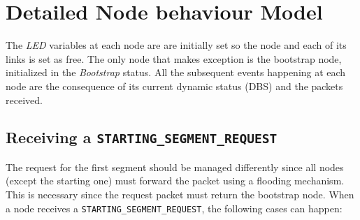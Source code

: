 \section{Detailed Node behaviour Model}
\label{sec:disr_detailed_model}

The \emph{LED} variables at each node are are initially set so the node and
each of its links is set as free. The only node that makes exception
is the bootstrap node, initialized in the \emph{Bootstrap} status. All
the subsequent events happening at each node are the consequence of
its current dynamic status (DBS) and the packets received.



\subsection{Receiving a \texttt{STARTING\_SEGMENT\_REQUEST}}

The request for the first segment should be managed differently since
all nodes (except the starting one) must forward the packet using a
flooding mechanism. This is necessary since the request packet must
return the bootstrap node.
When a node receives a \texttt{STARTING\_SEGMENT\_REQUEST}, the
following cases can happen:

